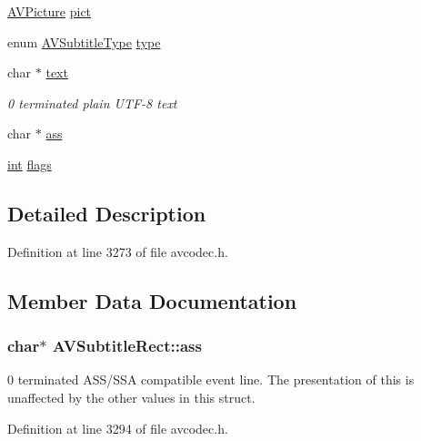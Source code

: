 \begin{DoxyCompactItemize}
\hyperlink{struct_a_v_picture}{A\+V\+Picture} \hyperlink{struct_a_v_subtitle_rect_a14d5940b24016a2c0afcaea2642fc692}{pict}
\item 
enum \hyperlink{group__lavc__core_ga828218dcb8874ab2c5af8d486c365421}{A\+V\+Subtitle\+Type} \hyperlink{struct_a_v_subtitle_rect_ad3cd08b87cdc6c7e8f0e7567d60598f2}{type}
\item 
char $\ast$ \hyperlink{struct_a_v_subtitle_rect_a893b1c87ee3d1816a0149ab3005fdd9e}{text}
\begin{DoxyCompactList}\small\item\em 0 terminated plain U\+T\+F-\/8 text \end{DoxyCompactList}\item 
char $\ast$ \hyperlink{struct_a_v_subtitle_rect_a0bac1af155080655b9571a3d869227da}{ass}
\item 
\hyperlink{xmltok_8h_a5a0d4a5641ce434f1d23533f2b2e6653}{int} \hyperlink{struct_a_v_subtitle_rect_a1eb6a2cfe6a14c7405f45fd83d76b8db}{flags}
\end{DoxyCompactItemize}


\subsection{Detailed Description}


Definition at line 3273 of file avcodec.\+h.



\subsection{Member Data Documentation}
\subsubsection[{\texorpdfstring{ass}{ass}}]{\setlength{\rightskip}{0pt plus 5cm}char$\ast$ A\+V\+Subtitle\+Rect\+::ass}\hypertarget{struct_a_v_subtitle_rect_a0bac1af155080655b9571a3d869227da}{}\label{struct_a_v_subtitle_rect_a0bac1af155080655b9571a3d869227da}
0 terminated A\+S\+S/\+S\+SA compatible event line. The presentation of this is unaffected by the other values in this struct. 

Definition at line 3294 of file avcodec.\+h.

